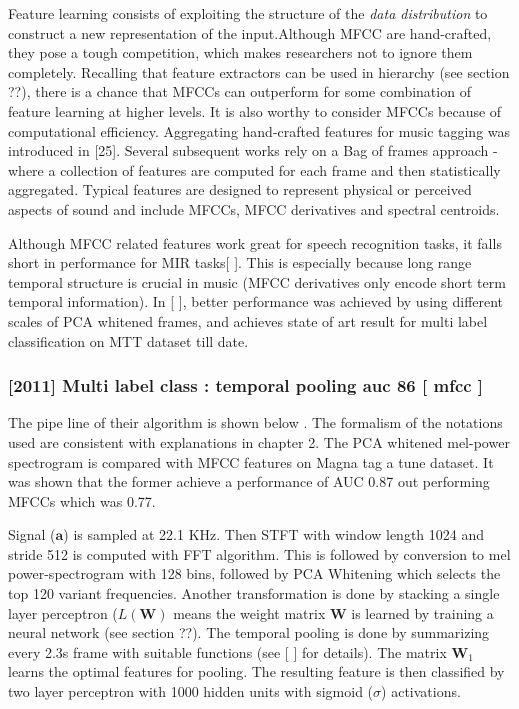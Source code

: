 Feature learning consists of exploiting the structure of the \textit{data distribution} to construct a new representation of the input.Although MFCC are hand-crafted, they pose a tough competition, which makes researchers not to ignore them completely. Recalling that feature extractors can be used in hierarchy (see section ??), there is a chance that MFCCs can outperform for some combination of feature learning at higher levels. It is also worthy to consider MFCCs because of computational efficiency. Aggregating hand-crafted features for music tagging was introduced in [25]. Several subsequent works rely on a Bag of frames approach - where a collection of features are computed for each frame and then statistically aggregated. Typical features are designed to represent physical or perceived aspects of sound and include MFCCs, MFCC derivatives and spectral centroids.
\bigskip

\noindent Although MFCC related features work great for speech recognition tasks, it falls short in performance for MIR tasks[ ]. This is especially because long range temporal structure is crucial in music (MFCC derivatives only encode short term temporal information). In [ ], better performance was achieved by using different scales of PCA whitened frames, and achieves state of art result for multi label classification on MTT dataset till date.


\subsubsection{[2011] Multi label class : temporal pooling auc 86  [ mfcc ]}

The pipe line of their algorithm is shown below . The formalism of the notations used are consistent with explanations in chapter 2. The PCA whitened mel-power spectrogram is compared with MFCC features on Magna tag a tune dataset. It was shown that the former achieve a performance of AUC 0.87 out performing MFCCs which was 0.77.  
\bigskip

\noindent Signal ($\textbf{a}$) is sampled at 22.1 KHz. Then STFT with window length 1024 and stride 512 is computed with FFT algorithm. This is followed by conversion to mel power-spectrogram with 128 bins, followed by PCA Whitening which selects the top 120 variant frequencies. Another transformation is done by stacking a single layer perceptron ($L(\textbf{W})$ means the weight matrix $\textbf{W}$ is learned by training a neural network (see section ??). The temporal pooling is done by summarizing every 2.3s frame with suitable functions (see [ ] for details). The matrix $\textbf{W}_{1}$ learns the optimal features for pooling. The resulting feature is then classified by two layer perceptron with 1000 hidden units with sigmoid ($\sigma$) activations.

